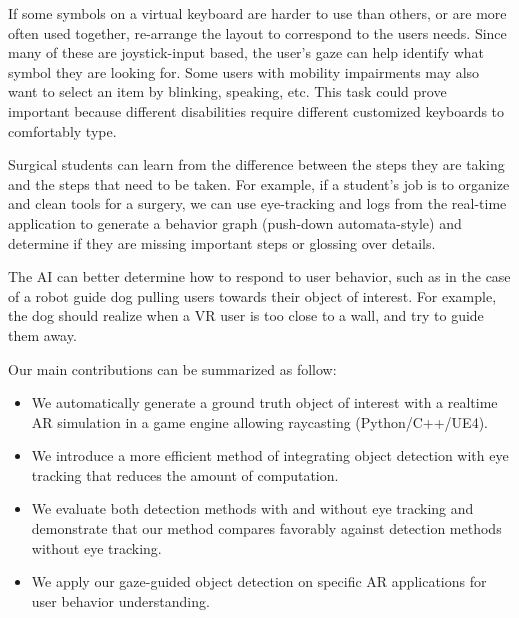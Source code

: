 \begin{description}[noitemsep]
    \item[Adaptive Impaired-user Keyboards]
        If some symbols on a virtual keyboard are harder to use than others, or
        are more often used together, re-arrange the layout to correspond to the
        users needs. Since many of these are joystick-input based, the user's
        gaze can help identify what symbol they are looking for. Some users with
        mobility impairments may also want to select an item by blinking,
        speaking, etc. This task could prove important because different
        disabilities require different customized keyboards to comfortably type.
    \item[Surgical Training] Surgical students can learn from the difference
        between the steps they are taking and the steps that need to be taken.
        For example, if a student's job is to organize and clean tools for a
        surgery, we can use eye-tracking and logs from the real-time application
        to generate a behavior graph (push-down automata-style) and determine if
        they are missing important steps or glossing over details.
    \item[Dynamic Robot AI]
        The AI can better determine how to respond to user behavior, such as in
        the case of a robot guide dog pulling users towards their object of
        interest. For example, the dog should realize when a VR user is too
        close to a wall, and try to guide them away.
\end{description}

Our main contributions can be summarized as follow:

\begin{itemize}[leftmargin=*,noitemsep]
    \item
        We automatically generate a ground truth object of interest with a
        realtime AR simulation in a game engine allowing raycasting
        (Python/C++/UE4).
    \item
        We introduce a more efficient method of integrating object detection
        with eye tracking that reduces the amount of computation.
    \item
        We evaluate both detection methods with and without eye tracking and
        demonstrate that our method compares favorably against detection methods
        without eye tracking.
    \item
        We apply our gaze-guided object detection on specific AR applications
        for user behavior understanding.
\end{itemize}



